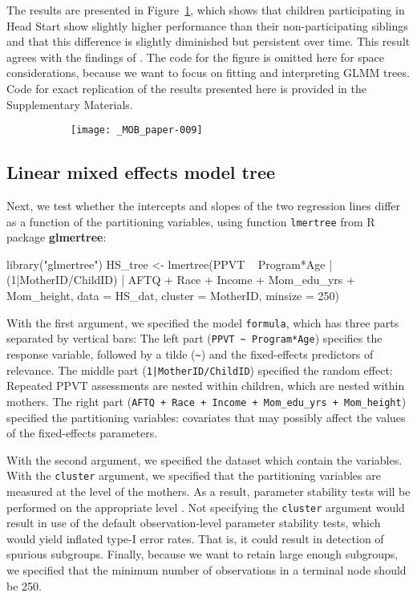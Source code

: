 \documentclass[doc,floatsintext,natbib]{apa7}
\begin{document}
The results are presented in Figure~\ref{fig:global_lmm}, which shows that children participating in Head Start show slightly higher performance than their non-participating siblings and that this difference is slightly diminished but persistent over time. This result agrees with the findings of \cite{Demi09}. The code for the figure is omitted here for space considerations, because we want to focus on fitting and interpreting GLMM trees. Code for exact replication of the results presented here is provided in the Supplementary Materials. 

\begin{figure}%
\caption{}
\begin{subfigure}{.7\textwidth}
\texttt{[image: \_MOB\_paper-009]}
\end{subfigure}
\label{fig:global_lmm}
\end{figure}%

\FloatBarrier
\subsection{Linear mixed effects model tree}

Next, we test whether the intercepts and slopes of the two regression lines differ as a function of the partitioning variables, using function \verb|lmertree| from R package \textbf{glmertree}:

\begin{Schunk}
\begin{Sinput}
 library("glmertree")
 HS_tree <- lmertree(PPVT ~ Program*Age | (1|MotherID/ChildID) | AFTQ + Race + 
                       Income + Mom_edu_yrs + Mom_height, 
                     data = HS_dat, cluster = MotherID, minsize = 250)
\end{Sinput}
\end{Schunk}

With the first argument, we specified the model \verb|formula|, which has three parts separated by vertical bars: The left part (\verb|PPVT ~ Program*Age|) specifies the response variable, followed by a tilde (\verb|~|) and the fixed-effects predictors of relevance. The middle part (\texttt{1|MotherID/ChildID}) specified the random effect: Repeated PPVT assessments are nested within children, which are nested within mothers. The right part (\verb|AFTQ + Race + Income + Mom_edu_yrs + Mom_height|) specified the partitioning variables: covariates that may possibly affect the values of the fixed-effects parameters. 

With the second argument, we specified the dataset which contain the variables. With the \texttt{cluster} argument, we specified that the partitioning variables are measured at the level of the mothers. As a result, parameter stability tests will be performed on the appropriate level \citep{FokkyZeil23}. Not specifying the \texttt{cluster} argument would result in use of the default observation-level parameter stability tests, which would yield inflated type-I error rates. That is, it could result in detection of spurious subgroups. Finally, because we want to retain large enough subgroups, we specified that the minimum number of observations in a terminal node should be 250.
\end{document}
